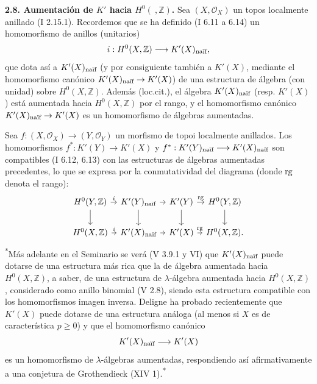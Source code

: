 \textbf{2.8. Aumentación de \(K'\) hacia \(H^0(\ ,\mathbb Z)\).} Sea \((X,\mathcal O_X)\) un topos localmente anillado (I 2.15.1). Recordemos que se ha definido (I 6.11 a 6.14) un homomorfismo de anillos (unitarios)
\[
 i:H^0(X,\mathbb Z)\longrightarrow K'(X)_{\naif},
\]
que dota así a \(K'(X)_{\naif}\) (y por consiguiente también a \(K'(X)\), mediante el homomorfismo canónico \(K'(X)_{\naif}\to K'(X)\)) de una estructura de álgebra (con unidad) sobre \(H^0(X,\mathbb Z)\). Además (loc.cit.), el álgebra \(K'(X)_{\naif}\) (resp. \(K'(X)\)) está aumentada hacia \(H^0(X,\mathbb Z)\) por el rango, y el homomorfismo canónico \(K'(X)_{\naif}\to K'(X)\) es un homomorfismo de álgebras aumentadas.

Sea \(f:(X,\mathcal O_X)\to(Y,\mathcal O_Y)\) un morfismo de topoi localmente anillados. Los homomorfismos \(f^*:K'(Y)\longrightarrow K'(X)\) y \(f^*:K'(Y)_{\naif}\longrightarrow K'(X)_{\naif}\) son compatibles (I 6.12, 6.13) con las estructuras de álgebras aumentadas precedentes, lo que se expresa por la conmutatividad del diagrama (donde \(\Rg\) denota el rango):
\[
\begin{tikzcd}[column sep=tiny]
H^0(Y,\mathbb Z)\arrow[r,"i"]\arrow[d]
&K'(Y)_{\naif}\arrow[r]\arrow[d]
&K'(Y)\arrow[r,"\Rg"]\arrow[d]
&H^0(Y,\mathbb Z)\arrow[d]\\
H^0(X,\mathbb Z)\arrow[r,"i"]
&K'(X)_{\naif}\arrow[r]
&K'(X)\arrow[r,"\Rg"]
&H^0(X,\mathbb Z).
\end{tikzcd}
\]
\textsuperscript{*}Más adelante en el Seminario se verá (V 3.9.1 y VI) que \(K'(X)_{\naif}\) puede dotarse de una estructura más rica que la de álgebra aumentada hacia \(H^0(X,\mathbb Z)\), a saber, de una estructura de \(\lambda\)-álgebra aumentada hacia \(H^0(X,\mathbb Z)\), considerado como anillo binomial (V 2.8), siendo esta estructura compatible con los homomorfismos imagen inversa. Deligne \sisi{[5]}{[1]} ha probado recientemente que \(K'(X)\) puede dotarse de una estructura análoga (al menos si \(X\) es de característica \(p\geq0\)) y que el homomorfismo canónico
\[
 K'(X)_{\naif}\longrightarrow K'(X)
\]
es un homomorfismo de \(\lambda\)-álgebras aumentadas, respondiendo así afirmativamente a una conjetura de Grothendieck (XIV 1).\textsuperscript{*}

